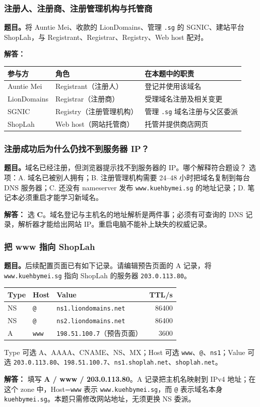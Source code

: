 \documentclass[11pt,a4paper,fontset=fandol]{ctexart}
\renewcommand{\exercisequestion}[2]{%
  \Needspace{5\baselineskip}%
  \subsubsection{#2}\label{exercise:#1}%
}
\renewenvironment{checkedsolution}
  {\par\nopagebreak[4]\textbf{解答：}\ignorespaces}
  {\par}
\begin{document}
\exercisequestion{SC2008-HW06-Q02}{注册人、注册商、注册管理机构与托管商}
\textbf{题目。}将 Auntie Mei、收款的 LionDomains、管理 \texttt{.sg} 的 SGNIC、建站平台 ShopLah，与 Registrant、Registrar、Registry、Web host 配对。
\begin{checkedsolution}
\begin{center}
\small
\begin{tabularx}{\linewidth}{@{}l l X@{}}
\toprule
参与方 & 角色 & 在本题中的职责 \\
\midrule
Auntie Mei & Registrant（注册人） & 登记并使用该域名 \\
LionDomains & Registrar（注册商） & 受理域名注册及相关变更 \\
SGNIC & Registry（注册管理机构） & 管理 \texttt{.sg} 域名注册与父区委派 \\
ShopLah & Web host（网站托管商） & 托管并提供商店网页 \\
\bottomrule
\end{tabularx}
\end{center}
\end{checkedsolution}

\exercisequestion{SC2008-HW06-Q03}{注册成功后为什么仍找不到服务器 IP？}
\textbf{题目。}域名已经注册，但浏览器提示找不到服务器的 IP。哪个解释符合题设？
选项：A. 域名已被别人拥有；B. 注册管理机构需要 24--48 小时把域名复制到每台 DNS 服务器；C. 还没有 nameserver 发布 \texttt{www.kuehbymei.sg} 的地址记录；D. 笔记本必须重启才能学习新域名。
\begin{checkedsolution}
选 \textbf{C}。域名登记与主机名的地址解析是两件事；必须有可查询的 DNS 记录，解析器才能给出网站 IP。重启电脑不能补上缺失的权威记录。
\end{checkedsolution}

\exercisequestion{SC2008-HW06-Q04}{把 www 指向 ShopLah}
\textbf{题目。}后续配置页面已有如下记录。请编辑预告页面的 A 记录，将 \texttt{www.kuehbymei.sg} 指向 ShopLah 的服务器 \texttt{203.0.113.80}。
\begin{center}
\small
\begin{tabular}{@{}lll r@{}}
\toprule
Type & Host & Value & TTL/s \\
\midrule
NS & \texttt{@} & \texttt{ns1.liondomains.net} & 86400 \\
NS & \texttt{@} & \texttt{ns2.liondomains.net} & 86400 \\
A & \texttt{www} & \texttt{198.51.100.7}（预告页面） & 3600 \\
\bottomrule
\end{tabular}
\end{center}
Type 可选 A、AAAA、CNAME、NS、MX；Host 可选 \texttt{www}、\texttt{@}、\texttt{ns1}；Value 可选 \texttt{203.0.113.80}、\texttt{198.51.100.7}、\texttt{ns1.shoplah.net}、\texttt{shoplah.net}。
\begin{checkedsolution}
填写 \textbf{A / www / 203.0.113.80}。A 记录把主机名映射到 IPv4 地址；在这个 zone 中，Host=\texttt{www} 表示 \texttt{www.kuehbymei.sg}，而 \texttt{@} 表示域名本身 \texttt{kuehbymei.sg}。本题只需修改网站地址，无须更换 NS 委派。
\end{checkedsolution}
\end{document}
